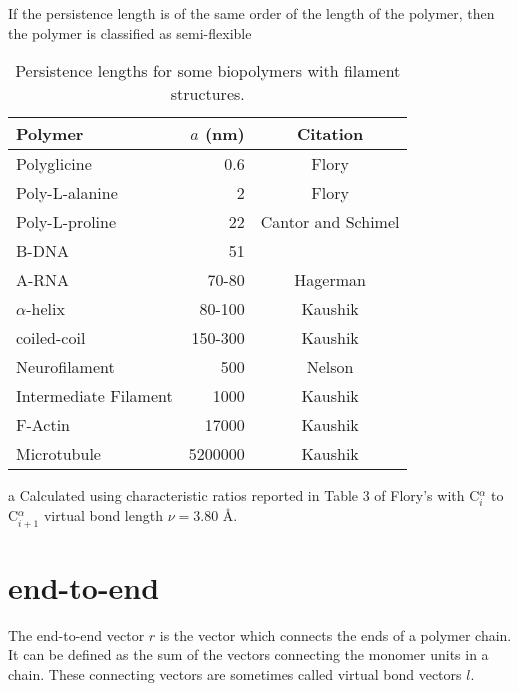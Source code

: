If the persistence length is of the same order of the length of the
polymer, then the polymer is classified as  semi-flexible

\begin{table}[htbp]
\begin{center}
\begin{threeparttable}
\begin{tabular}{l|r|c}
\hline
Polymer               & $a$ (nm) & Citation  \\ \hline
Polyglicine           & 0.6      &   Flory \tnote{a} \\
Poly-L-alanine        & 2        &   Flory \tnote{a}  \\
Poly-L-proline        & 22       &   Cantor and Schimel \\
B-DNA                 & 51       &            \\
A-RNA                 & 70-80    &   Hagerman \\
$\alpha$-helix        & 80-100   &   Kaushik  \\
coiled-coil           & 150-300  &   Kaushik  \\
Neurofilament         & 500      &   Nelson \cite{nelson2004}   \\
Intermediate Filament & 1000     &   Kaushik  \\
F-Actin               & 17000    &   Kaushik  \\
Microtubule           & 5200000  &   Kaushik  \\
\hline
\end{tabular}
\begin{tablenotes}
\item [a] Calculated using  characteristic ratios reported in Table 3
  of Flory's \cite{flory1969} with C$^{\alpha}_{i}$ to C$^{\alpha}_{i+1}$ virtual
  bond length $\nu = 3.80$ \AA.
\end{tablenotes}
\caption{Persistence lengths for some biopolymers with filament structures.}
\end{threeparttable}
\end{center}
\end{table}


\section{end-to-end}
The end-to-end vector  $r$ is the vector which connects  the ends of a 
polymer chain.  It  can be defined  as the sum  of the vectors connecting the
monomer units in a chain. These connecting vectors are sometimes called
virtual  bond vectors $l$.  

